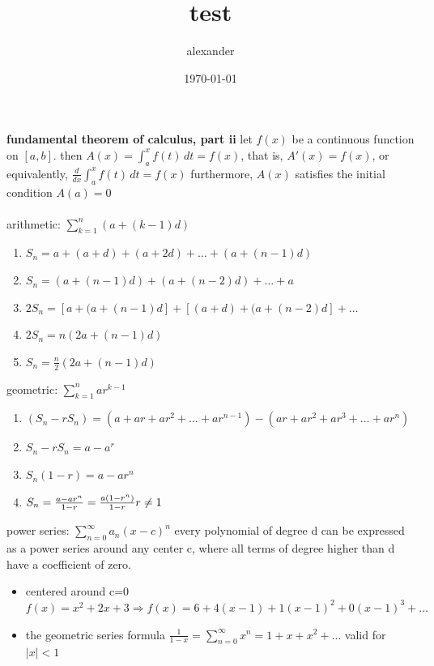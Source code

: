 \documentclass{article}
\title{test}
\author{alexander}
\date{\today}
\begin{document}
\maketitle

\textbf{fundamental theorem of calculus, part ii} let $f(x)$ be a continuous function on $[a, b]$. then $A(x) = \int_{a}^{x}f(t)\,dt = f(x)$, that is, $A'(x) = f(x)$, or equivalently, $\frac{d}{dx}\int_{a}^{x}f(t)\,dt = f(x)$ furthermore, $A(x)$ satisfies the initial condition $A(a) = 0$\\\\

arithmetic: $\sum_{k=1}^{n}(a + (k - 1)d)$
\begin{enumerate}
	\item $S_n = a + (a + d) + (a + 2d) + \ldots + (a + (n - 1)d)$
	\item $S_n = (a + (n - 1)d) + (a + (n - 2)d) + \ldots + a$	
	\item $2S_n = [a + (a + (n - 1)d] + [(a + d) + (a + (n - 2)d] + \ldots$
	\item $2S_n = n(2a + (n - 1)d)$
	\item $S_n = \frac{n}{2}(2a + (n - 1)d)$
\end{enumerate}

geometric: $\sum_{k=1}^{n}ar^{k-1}$
\begin{enumerate}
	\item $(S_n - rS_n) = (a + ar + ar^2 + \dots + ar^{n-1}) -  (ar + ar^2 + ar^3 + \ldots + ar^n)$
	\item $S_n - rS_n = a-a^r$
	\item $S_n(1 - r) = a-ar^n$
	\item $S_n = \frac{a - ar^n}{1 - r} = \frac{a(1 - r^n)}{1 - r}  \\ r \neq 1$
\end{enumerate}

power series: $\sum_{n=0}^{\infty}a_n(x - c)^n$ every polynomial of degree d can be expressed as a power series around any center c, where all terms of degree higher than d have a coefficient of zero.
\begin{itemize}
	\item centered around c=0 $f(x) = x^2 + 2x + 3 \Rightarrow f(x) = 6 + 4(x - 1) + 1(x - 1)^2 + 0(x - 1)^3 + \ldots$
	\item the geometric series formula $\frac{1}{1 - x} = \sum_{n=0}^{\infty}x^n = 1 + x + x^2 + \ldots$ valid for $\left| x \right| < 1$
\end{itemize}
\end{document}
